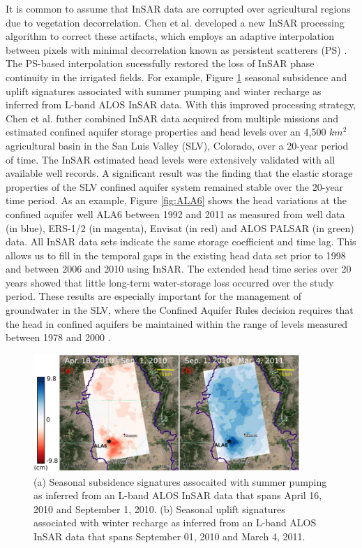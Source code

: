 \documentclass[11pt,final]{article}%
\renewcommand{\citep}{\cite}
\begin{document}
It is common to assume that InSAR data are corrupted over agricultural regions due to vegetation decorrelation. Chen et al. \cite{Chen2015}  developed a new InSAR processing algorithm to correct these artifacts, which employs an adaptive interpolation between pixels with minimal decorrelation known as persistent scatterers (PS) \citep{Shanker2007}. The PS-based interpolation sucessfully restored the loss of InSAR phase continuity in the irrigated fields. For example, Figure \ref{fig:seasonal_def} seasonal subsidence and uplift signatures associated with summer pumping and winter recharge as inferred from L-band ALOS InSAR data. With this improved processing strategy, Chen et al. \cite{Chen2017} futher combined InSAR data acquired from multiple missions and estimated confined aquifer storage properties and head levels over an 4,500 $km^2$ agricultural basin in the San Luis Valley (SLV), Colorado, over a 20-year period of time. The InSAR estimated head levels were extensively validated with all available well records. A significant result was the finding that the elastic storage properties of the SLV confined aquifer system remained stable over the 20-year time period. As an example, Figure \ref{fig:ALA6} shows the head variations at the confined aquifer well ALA6 between 1992 and 2011 as measured from well data (in blue), ERS-1/2 (in magenta), Envisat (in red) and ALOS PALSAR (in green) data. All InSAR data sets indicate the same storage coefficient and time lag. This allows us to fill in the temporal gaps in the existing head data set prior to 1998 and between 2006 and 2010 using InSAR. The extended head time series over 20 years showed that little long-term water-storage loss occurred over the study period. These results are especially important for the management of groundwater in the SLV, where the Confined Aquifer Rules decision requires that the head in confined aquifers be maintained within the range of levels measured between 1978 and 2000 \citep{Rules}.

\begin{figure}
\noindent\includegraphics[width=0.9\textwidth]{Figures/slv_seasonal.pdf}
\caption{ (a) Seasonal subsidence signatures assocaited with summer pumping as inferred from an L-band ALOS InSAR data that spans April 16, 2010 and September 1, 2010. (b) Seasonal uplift signatures associated with winter recharge as inferred from an L-band ALOS InSAR data that spans September 01, 2010 and March 4, 2011.}
\label{fig:seasonal_def}
\end{figure}
\end{document}
